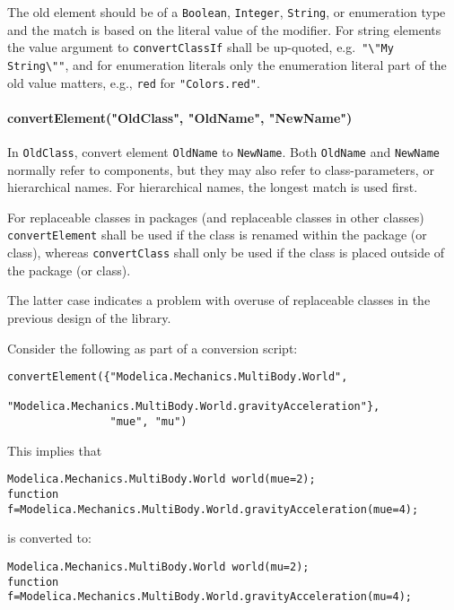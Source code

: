 The old element should be of a \lstinline!Boolean!, \lstinline!Integer!, \lstinline!String!, or enumeration
type and the match is based on the literal value of the modifier.
For string elements the value argument to \lstinline!convertClassIf! shall be up-quoted, e.g.\ \lstinline!"\"My String\""!,
and for enumeration literals only the enumeration literal part of the old value matters, e.g., \lstinline!red!
for \lstinline!"Colors.red"!.

\paragraph*{convertElement("OldClass", "OldName", "NewName")}\label{convertelementoldclassoldnamenewname}

In \lstinline!OldClass!, convert element \lstinline!OldName! to \lstinline!NewName!.  Both \lstinline!OldName! and \lstinline!NewName! normally refer to components, but they may also refer to
class-parameters, or hierarchical names.  For hierarchical names, the longest match is used first.

For replaceable classes in packages (and replaceable classes in other classes) \lstinline!convertElement! shall
be used if the class is renamed within the package (or class), whereas \lstinline!convertClass! shall only be used if the class
is placed outside of the package (or class).

\begin{nonnormative}
The latter case indicates a problem with overuse of replaceable classes in the previous design of the library.
\end{nonnormative}

\begin{example}
Consider the following as part of a conversion script:
\begin{lstlisting}[language=modelica]
convertElement({"Modelica.Mechanics.MultiBody.World",
                "Modelica.Mechanics.MultiBody.World.gravityAcceleration"},
                "mue", "mu")
\end{lstlisting}
This implies that
\begin{lstlisting}[language=modelica]
Modelica.Mechanics.MultiBody.World world(mue=2);
function f=Modelica.Mechanics.MultiBody.World.gravityAcceleration(mue=4);
\end{lstlisting}
is converted to:
\begin{lstlisting}[language=modelica]
Modelica.Mechanics.MultiBody.World world(mu=2);
function f=Modelica.Mechanics.MultiBody.World.gravityAcceleration(mu=4);
\end{lstlisting}
\end{example}

